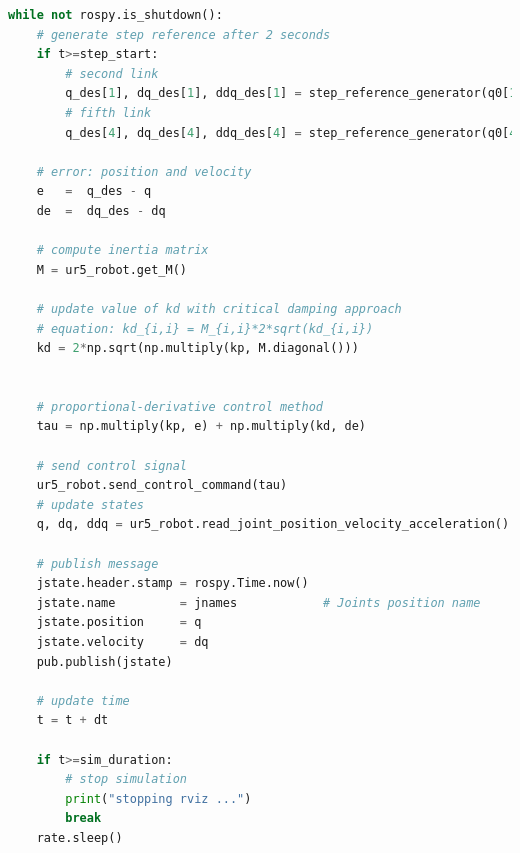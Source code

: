 \begin{lstlisting}[language=Python,caption={Move the second and fifth joint of UR5 robot with the requirement motion of activity 1.5.1}, label={lst:joint_PD_control_critical_damping}]
while not rospy.is_shutdown():
    # generate step reference after 2 seconds
    if t>=step_start:
        # second link
        q_des[1], dq_des[1], ddq_des[1] = step_reference_generator(q0[1], -0.4)
        # fifth link
        q_des[4], dq_des[4], ddq_des[4] = step_reference_generator(q0[4], 0.5)

    # error: position and velocity
    e 	=  q_des - q
    de 	=  dq_des - dq    

    # compute inertia matrix
    M = ur5_robot.get_M()

    # update value of kd with critical damping approach
    # equation: kd_{i,i} = M_{i,i}*2*sqrt(kd_{i,i})
    kd = 2*np.sqrt(np.multiply(kp, M.diagonal()))


    # proportional-derivative control method
    tau = np.multiply(kp, e) + np.multiply(kd, de)
    
    # send control signal
    ur5_robot.send_control_command(tau)
    # update states
    q, dq, ddq = ur5_robot.read_joint_position_velocity_acceleration()

    # publish message
    jstate.header.stamp = rospy.Time.now()
    jstate.name 		= jnames			# Joints position name
    jstate.position 	= q
    jstate.velocity 	= dq
    pub.publish(jstate)

    # update time
    t = t + dt

    if t>=sim_duration:
        # stop simulation
        print("stopping rviz ...")
        break
    rate.sleep()
\end{lstlisting}

